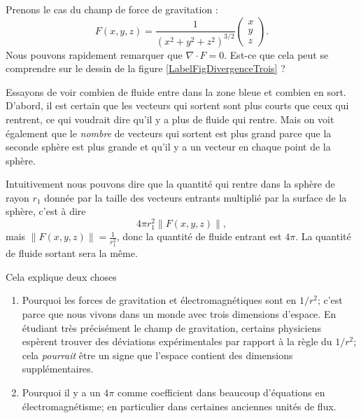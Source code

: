 \begin{example}
    Prenons le cas du champ de force de gravitation :
    \begin{equation}
        F(x,y,z)=\frac{1}{ (x^2+y^2+z^2)^{3/2} }\begin{pmatrix}
            x    \\ 
            y   \\
            z
        \end{pmatrix}.
    \end{equation}
    Nous pouvons rapidement remarquer que $\nabla\cdot F=0$. Est-ce que cela peut se comprendre sur le dessin de la figure \ref{LabelFigDivergenceTrois} ?
    \newcommand{\CaptionFigDivergenceTrois}{Le champ de vecteur de la gravité. Nous avons tracé, sur les deux cercles la même densité de vecteurs, c'est à dire le même nombre de vecteurs par unité de surface.}
    

    Essayons de voir combien de fluide entre dans la zone bleue et combien en sort. D'abord, il est certain que les vecteurs qui sortent sont plus courts que ceux qui rentrent, ce qui voudrait dire qu'il y a plus de fluide qui rentre. Mais on voit également que le \emph{nombre} de vecteurs qui sortent est plus grand parce que la seconde sphère est plus grande et qu'il y a un vecteur en chaque point de la sphère.

    Intuitivement nous pouvons dire que la quantité qui rentre dans la sphère de rayon $r_1$ donnée par la taille des vecteurs entrants multiplié par la surface de la sphère, c'est à dire
    \begin{equation}        \label{EqQpinormeVecto}
        4\pi r_1^2\| F(x,y,z) \|,
    \end{equation}
    mais $\| F(x,y,z) \|=\frac{1}{ r_1^2 }$, donc la quantité de fluide entrant est $4\pi$. La quantité de fluide sortant sera la même.

    Cela explique deux choses
    \begin{enumerate}
        \item
            Pourquoi les forces de gravitation et électromagnétiques sont en $1/r^2$; c'est parce que nous vivons dans un monde avec trois dimensions d'espace. En étudiant très précisément le champ de gravitation, certains physiciens espèrent trouver des déviations expérimentales par rapport à la règle du \( 1/r^2\); cela \emph{pourrait} être un signe que l'espace contient des dimensions supplémentaires.
        \item
            Pourquoi il y a un $4\pi$ comme coefficient dans beaucoup d'équations en électromagnétisme; en particulier dans certaines anciennes unités de flux.
    \end{enumerate}
    
\end{example}

